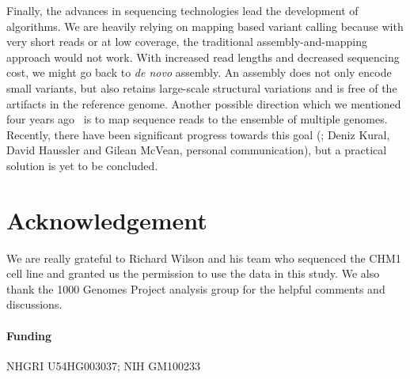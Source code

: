 \documentclass{bioinfo}
\begin{document}
Finally, the advances in sequencing technologies lead the development of
algorithms. We are heavily relying on mapping based variant calling because
with very short reads or at low coverage, the traditional
assembly-and-mapping approach would not work. With increased read
lengths and decreased sequencing cost, we might go back to \emph{de novo}
assembly. An assembly does not only encode small variants, but also
retains large-scale structural variations and is free of the artifacts in the
reference genome. Another possible direction which we mentioned four years
ago~\citep{Li:2010kx} is to map sequence reads to the ensemble of 
multiple genomes. Recently, there have been significant progress towards this
goal (; Deniz Kural, David Haussler
and Gilean McVean, personal communication), but a practical solution is yet to
be concluded.

\section*{Acknowledgement}
We are really grateful to Richard Wilson and his team who sequenced the CHM1 cell line
and granted us the permission to use the data in this study. We also thank the
1000 Genomes Project analysis group for the helpful comments and discussions.

\paragraph{Funding\textcolon} NHGRI U54HG003037; NIH GM100233


\end{document}
